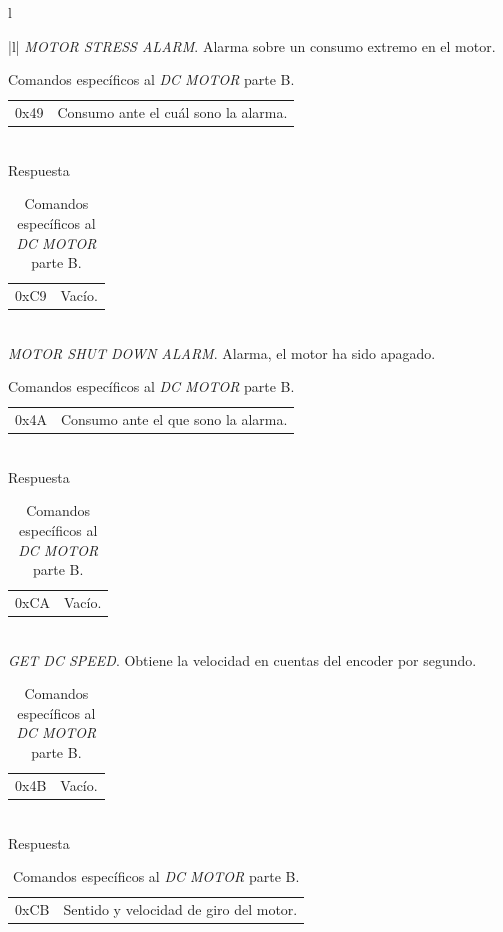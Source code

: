 \begin{table}
	\begin{center}
		\begin{tabular}{l}
			\begin{tabular}{|l|}
				\hline
				\emph{MOTOR STRESS ALARM}. Alarma sobre un consumo extremo en el motor. \\
				\hline
				\begin{tabular}{c|l}
					0x49 & Consumo ante el cu\'al sono la alarma. \\
				\end{tabular}
				\\
				\hline
				Respuesta \\
				\hline
				\begin{tabular}{c|l}
					0xC9 & Vac\'io. \\
				\end{tabular}
				\\
	
				\hline\hline
				\emph{MOTOR SHUT DOWN ALARM}. Alarma, el motor ha sido apagado. \\
				\hline
				\begin{tabular}{c|l}
					0x4A & Consumo ante el que sono la alarma. \\
				\end{tabular}
				\\
				\hline
				Respuesta \\
				\hline
				\begin{tabular}{c|l}
					0xCA & Vac\'io. \\
				\end{tabular}
				\\
	
				\hline\hline
				\emph{GET DC SPEED}. Obtiene la velocidad en cuentas del encoder por segundo. \\
				\hline
				\begin{tabular}{c|l}
					0x4B & Vac\'io.\\
				\end{tabular}
				\\
				\hline
				Respuesta \\
				\hline
				\begin{tabular}{c|l}
					0xCB & Sentido y velocidad de giro del motor. \\
				\end{tabular}
				\\
	
				\hline
			\end{tabular}
		\\
		\end{tabular}
		\caption{Comandos espec\'ificos al \emph{DC MOTOR} parte B. }
		\label{hT_comm_comandos_motordc_b}
	\end{center}
\end{table}

